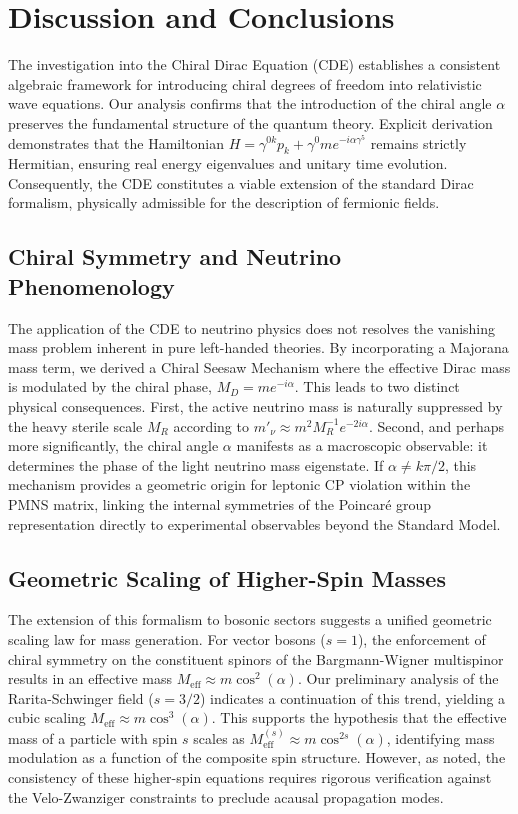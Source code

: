 \section{Discussion and Conclusions}
\label{sec:Discussion}

The investigation into the Chiral Dirac Equation (CDE) establishes a consistent
algebraic framework for introducing chiral degrees of freedom into relativistic
wave equations. Our analysis confirms that the introduction of the chiral angle
$\alpha$ preserves the fundamental structure of the quantum theory. Explicit
derivation demonstrates that the Hamiltonian $H = \gamma^{0k} p_k + \gamma^0 m
e^{-i \alpha \gamma^5}$ remains strictly Hermitian, ensuring real energy
eigenvalues and unitary time evolution. Consequently, the CDE constitutes a
viable extension of the standard Dirac formalism, physically admissible for the
description of fermionic fields.

\subsection{Chiral Symmetry and Neutrino Phenomenology}

The application of the CDE to neutrino physics does not resolves the vanishing mass
problem inherent in pure left-handed theories. By incorporating a Majorana mass
term, we derived a Chiral Seesaw Mechanism where the effective Dirac mass is
modulated by the chiral phase, $M_D = m e^{-i\alpha}$. This leads to two
distinct physical consequences. First, the active neutrino mass is naturally
suppressed by the heavy sterile scale $M_R$ according to $m'_{\nu} \approx m^2
M_R^{-1} e^{-2i\alpha}$. Second, and perhaps more significantly, the chiral
angle $\alpha$ manifests as a macroscopic observable: it determines the phase of
the light neutrino mass eigenstate. If $\alpha \neq k\pi/2$, this mechanism
provides a geometric origin for leptonic CP violation within the PMNS matrix,
linking the internal symmetries of the Poincar\'{e} group representation
directly to experimental observables beyond the Standard Model.

\subsection{Geometric Scaling of Higher-Spin Masses}

The extension of this formalism to bosonic sectors suggests a unified geometric
scaling law for mass generation. For vector bosons ($s=1$), the enforcement of
chiral symmetry on the constituent spinors of the Bargmann-Wigner multispinor
results in an effective mass $M_{\text{eff}} \approx m \cos^2\left(\alpha\right)$.
Our preliminary analysis of the Rarita-Schwinger field ($s=3/2$) indicates a
continuation of this trend, yielding a cubic scaling $M_{\text{eff}} \approx m
\cos^3\left(\alpha\right)$. This supports the hypothesis that the effective mass
of a particle with spin $s$ scales as $M_{\text{eff}}^{(s)} \approx m
\cos^{2s}\left(\alpha\right)$, identifying mass modulation as a function of the
composite spin structure. However, as noted, the consistency of these
higher-spin equations requires rigorous verification against the Velo-Zwanziger
constraints to preclude acausal propagation modes.

